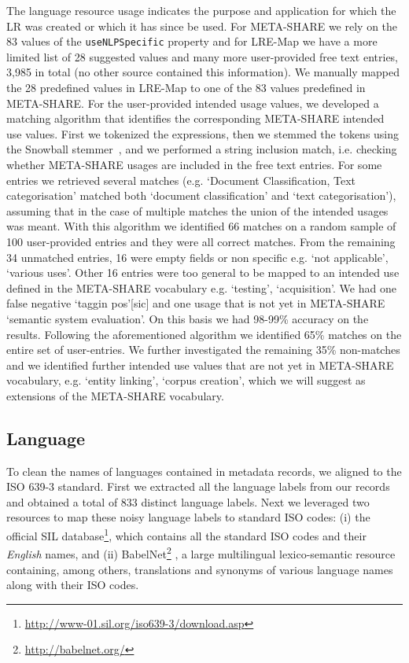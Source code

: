 \documentclass[11pt]{article}
\begin{document}
The language resource usage indicates the purpose and application for which 
the LR was created or which it has since be used. 
For META-SHARE we rely on the 83 values of the 
{\tt useNLPSpecific} property and for LRE-Map we have a more limited list 
of 28 suggested values and many more user-provided free text entries, 3,985 in
total (no other source contained this information). We manually mapped the 28
predefined values in LRE-Map to one of the 83 values predefined in META-SHARE.
For the user-provided intended usage values, we developed a matching algorithm
that identifies the corresponding META-SHARE intended use values. First we
tokenized the expressions, then we stemmed the tokens using the Snowball
stemmer~\cite{porter2001snowball}, and we performed a string inclusion match, i.e. checking whether
META-SHARE usages are included in the free text entries. For some entries we
retrieved several matches (e.g.  `Document Classification, Text categorisation'
matched both `document classification' and `text categorisation'), assuming that
in the case of multiple matches the union of the intended usages was meant.
With this algorithm we identified 66 matches on a random sample of 100
user-provided entries and they were all correct matches. From the remaining 34
unmatched entries, 16 were empty fields or non specific e.g.  `not applicable',
`various uses'. Other 16 entries were too general to be mapped to an intended
use defined in the META-SHARE vocabulary e.g. `testing', `acquisition'. We had
one false negative `taggin pos'[sic] and one usage that is not yet in META-SHARE
`semantic system evaluation'. On this basis we had 98-99\% accuracy on the
results.  Following the aforementioned algorithm we identified 65\% matches on
the entire set of user-entries. We further investigated the remaining 35\%
non-matches and we identified further intended use values that are not yet in
META-SHARE vocabulary, e.g.  `entity linking', `corpus creation', which we will
suggest as extensions of the META-SHARE vocabulary.

    
\subsection{Language}

To clean the names of languages contained in metadata records, we aligned
to the ISO 639-3 standard. First we extracted all the language labels
from our records and obtained a total of 833 distinct language labels. Next we
leveraged two resources to map these noisy language labels to standard ISO
codes: (i) the official SIL
database\footnote{\url{http://www-01.sil.org/iso639-3/download.asp}}, which
contains all the standard ISO codes and their \textit{English} names, and (ii)
BabelNet\footnote{\url{http://babelnet.org/}} \cite{NavigliPonzetto:12aij}, a
large multilingual lexico-semantic resource containing, among others,
translations and synonyms of various language names along with their ISO codes. 
\end{document}
